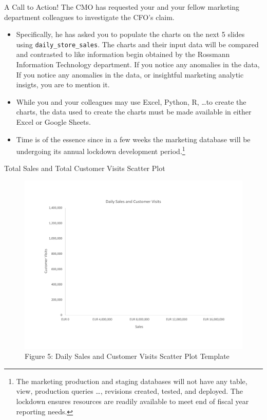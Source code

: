 \documentclass[pdf]{beamer}
\theoremstyle{remark}
\theoremstyle{definition}
\begin{document}
\begin{frame}[t]{A Call to Action!}
The CMO has requested your and your fellow marketing department colleagues to investigate the CFO's claim.  \\
\vspace{0.0ex}
\small
\begin{itemize}
\item Specifically, he has asked you to populate the charts on the next 5 slides using \texttt{daily\_store\_sales}.  The charts and their input data will be compared and contrasted to like information begin obtained by the Rossmann Information Technology department.  If you notice any anomalies in the data, If you notice any anomalies in the data, or insightful marketing analytic insigts, you are to mention it.  
\item While you and your colleagues may use Excel, Python, R, \ldots to create the charts, the data used to create the charts must be made available in either Excel or Google Sheets.
\item Time is of the essence since in a few weeks the marketing database will be undergoing its annual lockdown development period.\footnote{The marketing production and staging databases will not have any table, view, production queries \ldots, revisions created, tested, and deployed. The lockdown ensures resources are readily available to meet end of fiscal year reporting needs.} 
\end{itemize} 
\end{frame}

\begin{frame}[t]{Total Sales and Total Customer Visits Scatter Plot}
\begin{figure}[htbp]
    \centering
    \captionsetup{justification=centering}
    \includegraphics[clip, trim=0cm 2.3cm 0cm 2.3cm, width=1.0\textwidth]{Scatter_Plot_Unit_3_Template.pdf}  
    \caption{Figure {\color{franklinblue} 5}: Daily Sales and Customer Visits Scatter Plot Template}
    \label{fig:scatter0}
\end{figure}
\end{frame}
\end{document}
